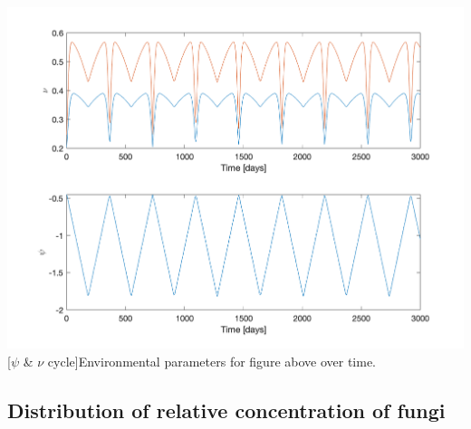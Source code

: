 \documentclass[12pt]{article}
\newenvironment{ColumnFigure}
{\par\medskip\noindent\minipage{\linewidth}}
{\endminipage\par\medskip}
\begin{document}
\begin{multicols}{2}
\begin{ColumnFigure}\label{Oscillating nu}
	\centering
	\includegraphics[width=\linewidth]{oscillating_psi_nu.png}
	[$\psi$ \& $\nu$ cycle]{Environmental parameters for figure above over time.}
\end{ColumnFigure}

\subsection*{Distribution of relative concentration of fungi}


\end{multicols}
\end{document}
